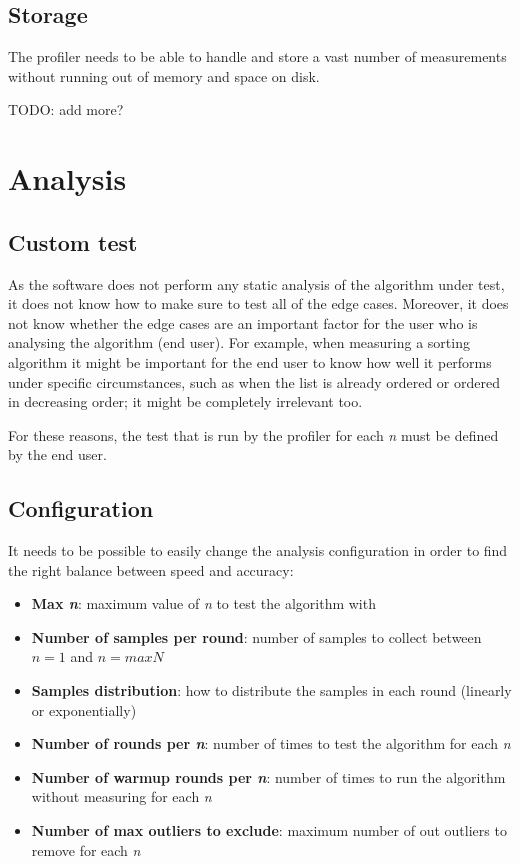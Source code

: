 \subsection{Storage}
The profiler needs to be able to handle and store a vast number of measurements without running out of memory and space on disk.


TODO: add more?

\section{Analysis}

\subsection{Custom test}
As the software does not perform any static analysis of the algorithm under test, it does not know how to make sure to test all of the edge cases. Moreover, it does not know whether the edge cases are an important factor for the user who is analysing the algorithm (end user). For example, when measuring a sorting algorithm it might be important for the end user to know how well it performs under specific circumstances, such as when the list is already ordered or ordered in decreasing order; it might be completely irrelevant too.

\noindent For these reasons, the test that is run by the profiler for each \emph{n} must be defined by the end user.

\subsection{Configuration}
It needs to be possible to easily change the analysis configuration in order to find the right balance between speed and accuracy:
\begin{itemize}
  \item \textbf{Max \emph{n}}: maximum value of \emph{n} to test the algorithm with
  \item \textbf{Number of samples per round}: number of samples to collect between $n = 1$ and $n = maxN$
  \item \textbf{Samples distribution}: how to distribute the samples in each round (linearly or exponentially)
  \item \textbf{Number of rounds per \emph{n}}: number of times to test the algorithm for each \emph{n}
  \item \textbf{Number of warmup rounds per \emph{n}}: number of times to run the algorithm without measuring for each \emph{n}
  \item \textbf{Number of max outliers to exclude}: maximum number of out outliers to remove for each \emph{n}
\end{itemize}


